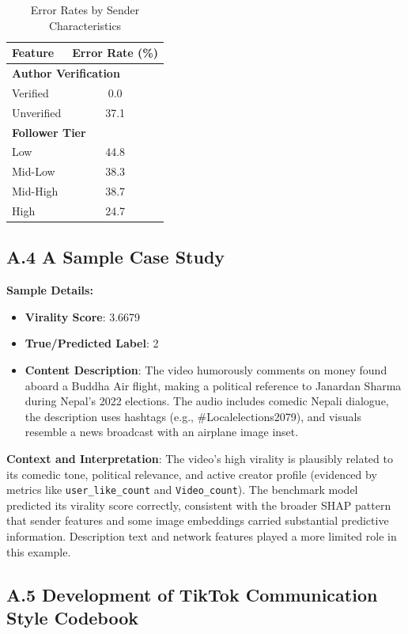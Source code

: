 \documentclass[12pt,a4paper]{report}
\begin{document}
\begin{table}[H]
\centering
\caption{Error Rates by Sender Characteristics}
\label{tab:error_by_sender}
\begin{tabular}{lc}
\toprule
\textbf{Feature} & \textbf{Error Rate (\%)} \\
\midrule
\multicolumn{2}{l}{\textbf{Author Verification}} \\
Verified & 0.0 \\
Unverified & 37.1 \\
\midrule
\multicolumn{2}{l}{\textbf{Follower Tier}} \\
Low & 44.8 \\
Mid-Low & 38.3 \\
Mid-High & 38.7 \\
High & 24.7 \\
\bottomrule
\end{tabular}
\end{table}

\subsection*{A.4 A Sample Case Study}
\label{app:samplecase}
\textbf{Sample Details:}
\begin{itemize}
    \item \textbf{Virality Score}: 3.6679
    \item \textbf{True/Predicted Label}: 2
    \item \textbf{Content Description}: The video humorously comments on money found aboard a Buddha Air flight, making a political reference to Janardan Sharma during Nepal’s 2022 elections. The audio includes comedic Nepali dialogue, the description uses hashtags (e.g., \#Localelections2079), and visuals resemble a news broadcast with an airplane image inset.
\end{itemize}

\textbf{Context and Interpretation}: The video's high virality is plausibly related to its comedic tone, political relevance, and active creator profile (evidenced by metrics like \texttt{user\_like\_count} and \texttt{Video\_count}). The benchmark model predicted its virality score correctly, consistent with the broader SHAP pattern that sender features and some image embeddings carried substantial predictive information. Description text and network features played a more limited role in this example.
\clearpage
\subsection*{A.5 Development of TikTok Communication Style Codebook}
\label{app:codebook}
\end{document}
